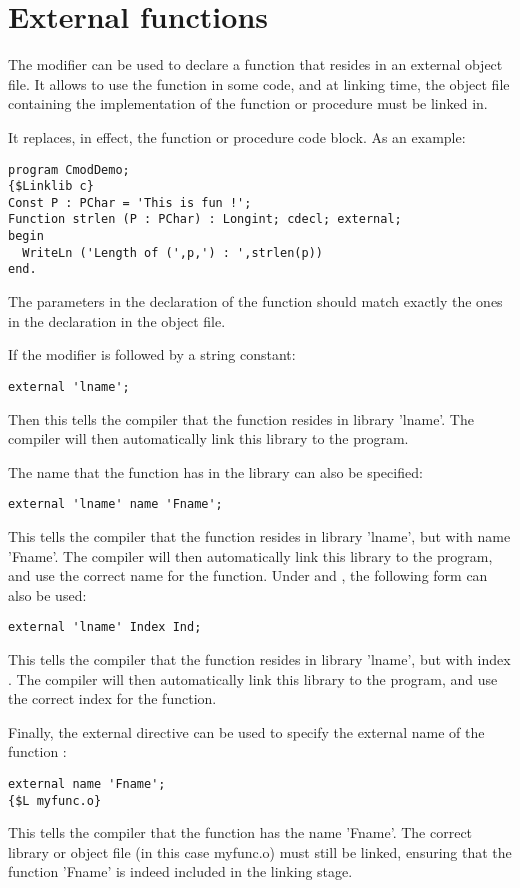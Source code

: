 \section{External functions}
\label{se:external}
The  modifier can be used to declare a function that resides in
an external object file. It allows to use the function in some code, and at
linking time, the object file containing the implementation of the function
or procedure must be linked in.

It replaces, in effect, the function or procedure code block.
As an example:
\begin{verbatim}
program CmodDemo;
{$Linklib c}
Const P : PChar = 'This is fun !';
Function strlen (P : PChar) : Longint; cdecl; external;
begin
  WriteLn ('Length of (',p,') : ',strlen(p))
end.
\end{verbatim}
\begin{remark}
The parameters in the declaration of the  function
should match exactly the ones in the declaration in the object file.
\end{remark}
If the  modifier is followed by a string constant:
\begin{verbatim}
external 'lname';
\end{verbatim}
Then this tells the compiler that the function resides in library
'lname'. The compiler will then automatically link this library to
the program.

The name that the function has in the library can also be specified:
\begin{verbatim}
external 'lname' name 'Fname';
\end{verbatim}
This tells the compiler that the function resides in library 'lname',
but with name 'Fname'. The compiler will then automatically link this
library to the program, and use the correct name for the function.
Under \windows and \ostwo, the following form can also be used:
\begin{verbatim}
external 'lname' Index Ind;
\end{verbatim}
This tells the compiler that the function resides in library 'lname',
but with index . The compiler will then automatically
link this library to the program, and use the correct index for the
function.

Finally, the external directive can be used to specify the external name
of the function :
\begin{verbatim}
external name 'Fname';
{$L myfunc.o}
\end{verbatim}
%
This tells the compiler that the function has the name 'Fname'. The
correct library or object file (in this case myfunc.o) must still be linked,
ensuring that the function 'Fname' is indeed included in the linking stage.

